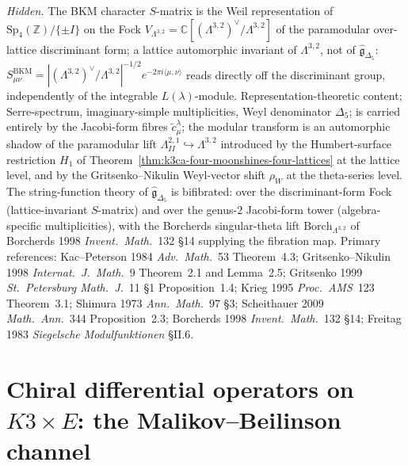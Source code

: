 \begin{remark}
\emph{Hidden.} The BKM character $S$-matrix is the Weil representation of $\mathrm{Sp}_4(\mathbb Z)/\{\pm I\}$ on the Fock $V_{\Lambda^{3,2}}=\mathbb C[(\Lambda^{3,2})^\vee/\Lambda^{3,2}]$ of the paramodular over-lattice discriminant form; a lattice automorphic invariant of $\Lambda^{3,2}$, not of $\hat{\mathfrak g}_{\Delta_5}$: $S^{\mathrm{BKM}}_{\mu\nu}=|(\Lambda^{3,2})^\vee/\Lambda^{3,2}|^{-1/2}e^{-2\pi i\langle\mu,\nu\rangle}$ reads directly off the discriminant group, independently of the integrable $L(\lambda)$-module. Representation-theoretic content; Serre-spectrum, imaginary-simple multiplicities, Weyl denominator $\Delta_5$; is carried entirely by the Jacobi-form fibres $\tilde c^\lambda_\mu$; the modular transform is an automorphic shadow of the paramodular lift $\Lambda^{2,1}_{II}\hookrightarrow\Lambda^{3,2}$ introduced by the Humbert-surface restriction $H_1$ of Theorem~\ref{thm:k3ca-four-moonshines-four-lattices} at the lattice level, and by the Gritsenko--Nikulin Weyl-vector shift $\rho_W$ at the theta-series level. The string-function theory of $\hat{\mathfrak g}_{\Delta_5}$ is bifibrated: over the discriminant-form Fock (lattice-invariant $S$-matrix) and over the genus-$2$ Jacobi-form tower (algebra-specific multiplicities), with the Borcherds singular-theta lift $\mathrm{Borch}_{\Lambda^{3,2}}$ of Borcherds 1998 \emph{Invent.\ Math.}~132 \S14 supplying the fibration map.
Primary references: Kac--Peterson 1984 \emph{Adv.\ Math.}~53 Theorem~4.3; Gritsenko--Nikulin 1998 \emph{Internat.\ J.\ Math.}~9 Theorem~2.1 and Lemma~2.5; Gritsenko 1999 \emph{St.\ Petersburg Math.\ J.}~11 \S1 Proposition~1.4; Krieg 1995 \emph{Proc.\ AMS}~123 Theorem~3.1; Shimura 1973 \emph{Ann.\ Math.}~97 \S3; Scheithauer 2009 \emph{Math.\ Ann.}~344 Proposition~2.3; Borcherds 1998 \emph{Invent.\ Math.}~132 \S14; Freitag 1983 \emph{Siegelsche Modulfunktionen} \S II.6.
\end{remark}

\section{Chiral differential operators on \texorpdfstring{$K3\times E$}{K3x E}: the Malikov--Beilinson channel}
\label{sec:k3ca-cdo-malikov-beilinson}

